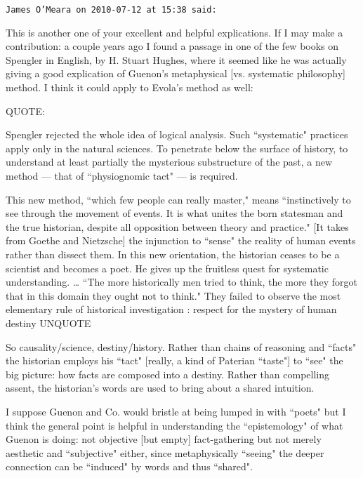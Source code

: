\begin{footnotesize}\begin{sffamily}



\texttt{James O'Meara on 2010-07-12 at 15:38 said: }

This is another one of your excellent and helpful explications. If I may make a contribution: a couple years ago I found a passage in one of the few books on Spengler in English, by H. Stuart Hughes, where it seemed like he was actually giving a good explication of Guenon's metaphysical [vs. systematic philosophy] method. I think it could apply to Evola's method as well:

QUOTE:

Spengler rejected the whole idea of logical analysis. Such ``systematic" practices apply only in the natural sciences. To penetrate below the surface of history, to understand at least partially the mysterious substructure of the past, a new method — that of ``physiognomic tact" — is required.

This new method, ``which few people can really master," means ``instinctively to see through the movement of events. It is what unites the born statesman and the true historian, despite all opposition between theory and practice." [It takes from Goethe and Nietzsche] the injunction to ``sense" the reality of human events rather than dissect them. In this new orientation, the historian ceases to be a scientist and becomes a poet. He gives up the fruitless quest for systematic understanding. … ``The more historically men tried to think, the more they forgot that in this domain they ought not to think." They failed to observe the most elementary rule of historical investigation : respect for the mystery of human destiny UNQUOTE

So causality/science, destiny/history. Rather than chains of reasoning and ``facts" the historian employs his ``tact" [really, a kind of Paterian ``taste"] to ``see" the big picture: how facts are composed into a destiny. Rather than compelling assent, the historian's words are used to bring about a shared intuition.

I suppose Guenon and Co. would bristle at being lumped in with ``poets" but I think the general point is helpful in understanding the ``epistemology" of what Guenon is doing: not objective [but empty] fact-gathering but not merely aesthetic and ``subjective" either, since metaphysically ``seeing" the deeper connection can be ``induced" by words and thus ``shared".


\end{sffamily}\end{footnotesize}
